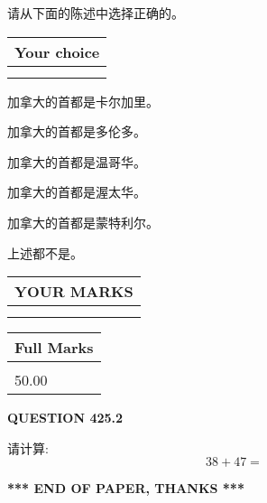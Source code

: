 \documentclass{ctexart}
\begin{document}
  
请从下面的陈述中选择正确的。
  
  
\noindent\hspace{3.0in} \begin{tabular}{|l|}
\hline
Your choice \\
\hline
 \\ 
 \\ 
\hline
\end{tabular}
  
  
 
 
加拿大的首都是卡尔加里。
 
 
加拿大的首都是多伦多。
 
 
加拿大的首都是温哥华。
 
 
加拿大的首都是渥太华。
 
 
加拿大的首都是蒙特利尔。
 
 
 上述都不是。
 
 
  
\vspace{0.2in}
  
\noindent\begin{tabular}{|l|}
\hline
 YOUR MARKS  \\
\hline
 \\ 
 \\ 
\hline
\end{tabular}
\hspace{0.05in} \begin{tabular}{|l|}
\hline
 Full Marks  \\
\hline
 \\ 
50.00 \\
\hline
\end{tabular}
{\textbf{\Large{QUESTION
425.2 
}}}
  
  
 
请计算:
\begin{equation}
38 +  %
47 = \nonumber
\end{equation}
 

 

 
   
   
 \vspace{0.2in}
 
   
   
   
   
\vspace{1.0in} 
{\textbf{\large{ *** END OF PAPER, THANKS *** }}} 
   
\end{document}
